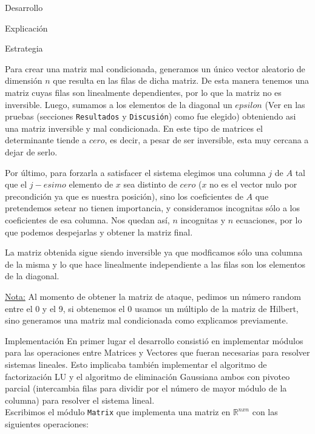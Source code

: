 \begin{section}{Desarrollo}
\begin{subsection}{Explicación}
\begin{subsubsection}{Estrategia}
\begin{enumerate}
			Para crear una matriz mal condicionada, generamos un único vector aleatorio de dimensión $n$ que resulta en las filas de dicha matriz. De esta manera tenemos una matriz cuyas filas son linealmente dependientes, por lo que la matriz no es inversible. Luego, sumamos a los elementos de la diagonal un $epsilon$ (Ver en las pruebas (secciones \texttt{Resultados} y \texttt{Discusión}) como fue elegido) obteniendo asi una matriz inversible y mal condicionada. En este tipo de matrices el determinante tiende a $cero$, es decir, a pesar de ser inversible, esta muy cercana a dejar de serlo.
			
			Por último, para forzarla a satisfacer el sistema elegimos una columna $j$ de $A$ tal que el $j-esimo$ elemento de $x$ sea distinto de $cero$ ($x$ no es el vector nulo por precondición ya que es nuestra posición), sino los coeficientes de $A$ que pretendemos setear no tienen importancia, y consideramos incognitas sólo a los coeficientes de esa columna. Nos quedan así, $n$ incognitas y $n$ ecuaciones, por lo que podemos despejarlas y obtener la matriz final.
			
			La matriz obtenida sigue siendo inversible ya que modficamos sólo una columna de la misma y lo que hace linealmente independiente a las filas son los elementos de la diagonal.
			
			\underline{Nota:} Al momento de obtener la matriz de ataque, pedimos un número random entre el 0 y el 9, si obtenemos el 0 usamos un múltiplo de la matriz de Hilbert, sino generamos una matriz mal condicionada como explicamos previamente.
			\end{enumerate}
		\end{subsubsection}
	\end{subsection}
	\begin{subsection}{Implementación}
		En primer lugar el desarrollo consistió en implementar módulos para las operaciones entre Matrices y Vectores que fueran necesarias para resolver sistemas lineales. Esto implicaba también implementar el algoritmo de factorización LU y el algoritmo de eliminación Gaussiana ambos con pivoteo parcial (intercambia filas para dividir por el número de mayor módulo de la columna) para resolver el sistema lineal.\\
		
		Escribimos el módulo \texttt{Matrix} que implementa una matriz en $\mathbb{R}^{nxn}$ con las siguientes operaciones:\\
		

\end{subsection}
\end{section}
